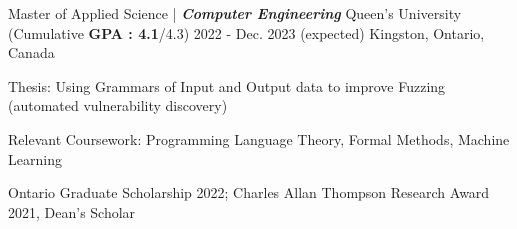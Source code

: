 

\begin{cventries}

  \cventry
    {Master of Applied Science | \textit{\textbf{Computer Engineering}}} %
    {Queen's University {\normalfont (\normalsize{Cumulative \textbf{GPA : 4.1}/4.3})}} %
    {2022 - Dec. 2023 (expected)} %
    {Kingston, Ontario, Canada} %
    {
    \begin{cvitems} %
        \item {Thesis: Using Grammars of Input and Output data to improve Fuzzing (automated vulnerability discovery)}
        \item {Relevant Coursework: Programming Language Theory, Formal Methods, Machine Learning}
        \item{Ontario Graduate Scholarship 2022; Charles Allan Thompson Research Award 2021, Dean's Scholar}
      \end{cvitems}
    }


\end{cventries}
